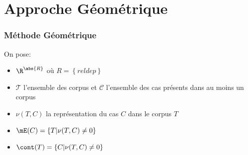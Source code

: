 \documentclass[noamsthm]{beamercours}
\begin{document}
\section{Approche Géométrique}\label{sec:géométrie}
\begin{frame}
        \frametitle{Méthode Géométrique}
        On pose:
        \begin{itemize}
                \item $\R^{\abs{R}}$ où $R = \left\{\textit{reldep}\right\}$
                \item $\mathcal{T}$ l'ensemble des corpus et $\mathscr{C}$ l'ensemble des cas présents dans au moins un corpus
                \item $\nu(T, C)$ la représentation du cas $C$ dans le corpus $T$
                \item $\mE(C) = \left\{T \middle| \nu(T, C) \neq 0\right\}$
                \item $\cont(T) = \left\{C \middle| \nu(T, C) \neq 0\right\}$
        \end{itemize}
\end{frame}
\end{document}
